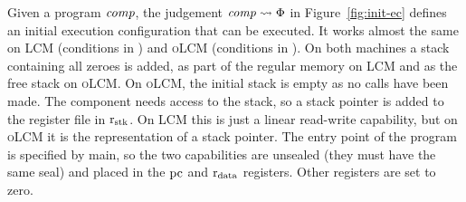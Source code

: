 \documentclass[acmsmall,screen]{acmart}\settopmatter{}
\newcommand{\trgcm}{\textsc{LCM}}
\newcommand{\srccm}{\textsc{oLCM}}
\begin{document}
Given a program $\mathit{comp}$, the judgement $\mathit{comp} \rightsquigarrow \Phi$ in Figure~\ref{fig:init-ec} defines an initial execution configuration that can be executed.
It works almost the same on \trgcm{} (conditions in ) and \srccm{} (conditions in ).
On both machines a stack containing all zeroes is added, as part of the regular memory on \trgcm{} and as the free stack on \srccm{}.
On \srccm{}, the initial stack is empty as no calls have been made.
The component needs access to the stack, so a stack pointer is added to the register file in $\mathrm{r}_\mathrm{stk}$.
On \trgcm{} this is just a linear read-write capability, but on \srccm{} it is the representation of a stack pointer.
The entry point of the program is specified by main, so the two capabilities are unsealed (they must have the same seal) and placed in the $\mathrm{pc}$ and $\mathrm{r}_\mathrm{data}$ registers.
Other registers are set to zero.
\end{document}
